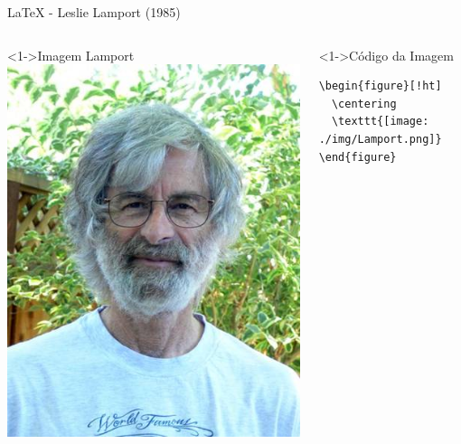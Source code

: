 \documentclass[bigger]{beamer}
\begin{document}
{\begin{frame}[label={sec:org1074210},fragile]{\LaTeX{} - Leslie Lamport (1985)}
 \begin{columns}
\begin{column}{0.48\columnwidth}
\begin{block}<1->{Imagem Lamport}
\href{img/Leslie\_Lamport.jpg}{\includegraphics[width=1.02\textwidth]{./img/Leslie_Lamport.jpg}}
\pause
\transblindshorizontal[duration=0.8]
\end{block}
\end{column}
\begin{column}{0.48\columnwidth}
\begin{block}<1->{Código da Imagem}
\begin{verbatim}
\begin{figure}[!ht]
  \centering
  \texttt{[image: ./img/Lamport.png]}
\end{figure}
\end{verbatim}
\end{block}
\end{column}
\end{columns}
\end{frame}

}
\end{document}
